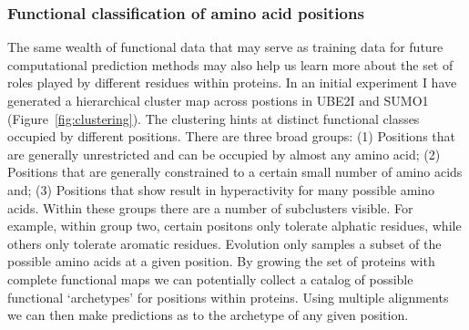 \subsubsection{Functional classification of amino acid positions}
The same wealth of functional data that may serve as training data for future computational prediction methods may also help us learn more about the set of roles played by different residues within proteins. In an initial experiment I have generated a hierarchical cluster map across postions in UBE2I and SUMO1 (Figure~\ref{fig:clustering}). The clustering hints at distinct functional classes occupied by different positions. There are three broad groups: (1) Positions that are generally unrestricted and can be occupied by almost any amino acid; (2) Positions that are generally constrained to a certain small number of amino acids and; (3) Positions that show result in hyperactivity for many possible amino acids. Within these groups there are a number of subclusters visible. For example, within group two, certain positons only tolerate alphatic residues, while others only tolerate aromatic residues. Evolution only samples a subset of the possible amino acids at a given position. By growing the set of proteins with complete functional maps we can potentially collect a catalog of possible functional `archetypes' for positions within proteins. Using multiple alignments we can then make predictions as to the archetype of any given position.

